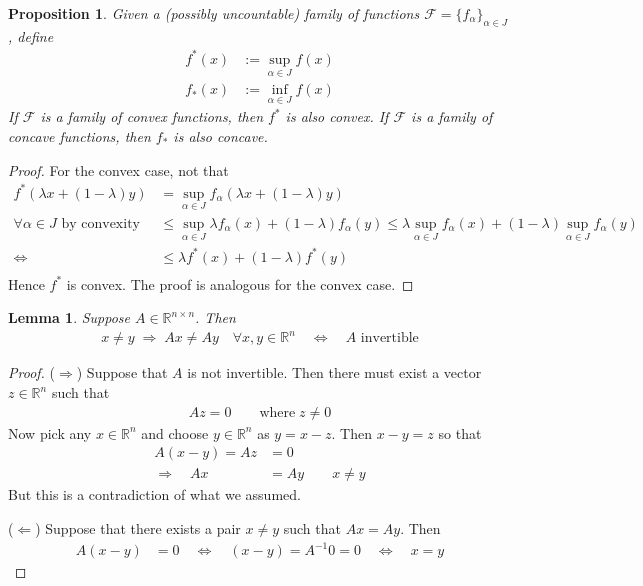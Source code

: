 \documentclass[12pt]{article}
\numberwithin{equation}{section} %
\theoremstyle{plain}
\newtheorem{lem}[thm]{Lemma}
\newtheorem{prop}[thm]{Proposition}
\theoremstyle{definition}
\theoremstyle{remark}
\newcommand{\Rn}{\mathbb{R}^n}
\newcommand{\Rnn}{\mathbb{R}^{n\times n}}
\begin{document}
\begin{prop}
\label{prop:supconvex}
Given a (possibly uncountable) family of functions
$\mathscr{F}=\{f_\alpha\}_{\alpha\in J}$, define
\begin{align*}
  f^*(x) &:= \sup_{\alpha\in J} f(x)\\
  f_*(x) &:= \inf_{\alpha\in J} f(x)
\end{align*}
If $\mathscr{F}$ is a family of convex functions, then $f^*$ is also
convex. If $\mathscr{F}$ is a family of concave functions, then $f_*$ is
also concave.
\end{prop}
\begin{proof}
For the convex case, not that
\begin{align*}
  f^*(\lambda x + (1-\lambda)y)
  &= \sup_{\alpha \in J}
  f_\alpha(\lambda x + (1-\lambda)y)\\
  \text{$\forall \alpha\in J$ by convexity} \qquad
  &\leq \sup_{\alpha \in J}
  \lambda f_\alpha(x) + (1-\lambda)f_\alpha(y)
  \leq \lambda \sup_{\alpha \in J} f_\alpha(x)
  + (1-\lambda)\sup_{\alpha \in J} f_\alpha(y)\\
  \Leftrightarrow\quad
  &\leq \lambda f^*(x)
  + (1-\lambda) f^*(y)\\
\end{align*}
Hence $f^*$ is convex. The proof is analogous for the convex case.
\end{proof}

\begin{lem}
\label{lem:unique-invertible}
Suppose $A\in\Rnn$. Then
\begin{align*}
  x\neq y\;\Rightarrow\;
  Ax \neq Ay
  \quad \forall x,y\in\Rn
  \quad\iff\quad
  \text{$A$ invertible}
\end{align*}
\end{lem}
\begin{proof}
($\Rightarrow$) Suppose that $A$ is not invertible. Then there must
exist a vector $z\in\Rn$ such that
\begin{align*}
  Az = 0
  \qquad \text{where} \; z\neq 0
\end{align*}
Now pick any $x\in\Rn$ and choose $y\in\Rn$ as $y=x-z$. Then
$x-y=z$ so that
\begin{align*}
  A(x-y) = Az &= 0 \\
  \Rightarrow\quad
  Ax &= Ay
  \qquad x\neq y
\end{align*}
But this is a contradiction of what we assumed.

($\Leftarrow$) Suppose that there exists a pair $x\neq y$ such that
$Ax=Ay$. Then
\begin{align*}
  A(x-y) &= 0
  \quad\iff\quad
  (x-y) = A^{-1}0 = 0
  \quad\iff\quad
  x =y
\end{align*}
\end{proof}
\end{document}
